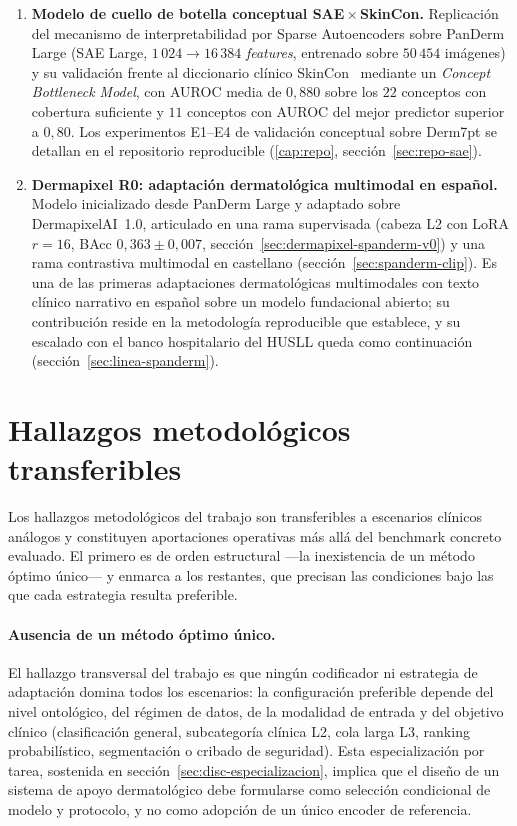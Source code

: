 \begin{enumerate}
\item \textbf{Modelo de cuello de botella conceptual SAE${}\times{}$SkinCon.}
Replicación del mecanismo de interpretabilidad por Sparse
Autoencoders sobre PanDerm Large (SAE Large,
$1\,024 \to 16\,384$ \emph{features}, entrenado sobre
$50\,454$ imágenes) y su validación frente al diccionario
clínico SkinCon~\cite{skincon} mediante un \emph{Concept
Bottleneck Model}, con AUROC media de $0{,}880$ sobre los
$22$ conceptos con cobertura suficiente y $11$ conceptos con
AUROC del mejor predictor superior a $0{,}80$. Los experimentos
E1--E4 de validación conceptual sobre Derm7pt se detallan en el
repositorio reproducible (\ref{cap:repo}, sección~\ref{sec:repo-sae}).

\item \textbf{Dermapixel R0: adaptación dermatológica multimodal
en español.} Modelo inicializado desde PanDerm Large y adaptado sobre
DermapixelAI~1.0, articulado en una rama supervisada (cabeza L2 con LoRA
$r=16$, BAcc $0{,}363 \pm 0{,}007$, sección~\ref{sec:dermapixel-spanderm-v0})
y una rama contrastiva multimodal en castellano
(sección~\ref{sec:spanderm-clip}). Es una de las primeras adaptaciones
dermatológicas multimodales con texto clínico narrativo en español sobre
un modelo fundacional abierto; su contribución reside en la metodología
reproducible que establece, y su escalado con el banco hospitalario del
HUSLL queda como continuación (sección~\ref{sec:linea-spanderm}).
\end{enumerate}

\section{Hallazgos metodológicos transferibles}
\label{sec:hallazgos-conc}

Los hallazgos metodológicos del trabajo son transferibles a
escenarios clínicos análogos y constituyen aportaciones operativas
más allá del benchmark concreto evaluado. El primero es de orden
estructural ---la inexistencia de un método óptimo único--- y
enmarca a los restantes, que precisan las condiciones bajo las que
cada estrategia resulta preferible.

\paragraph{Ausencia de un método óptimo único.}
El hallazgo transversal del trabajo es que ningún codificador ni
estrategia de adaptación domina todos los escenarios: la
configuración preferible depende del nivel ontológico, del régimen
de datos, de la modalidad de entrada y del objetivo clínico
(clasificación general, subcategoría clínica L2, cola larga L3,
ranking probabilístico, segmentación o cribado de seguridad). Esta
especialización por tarea, sostenida en
sección~\ref{sec:disc-especializacion}, implica que el diseño de un
sistema de apoyo dermatológico debe formularse como selección
condicional de modelo y protocolo, y no como adopción de un único
encoder de referencia.

